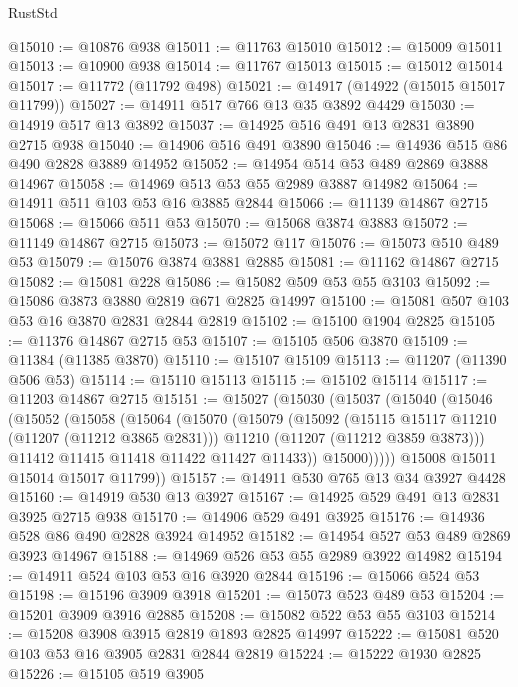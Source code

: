 \begin{lexlean}{RustStd}
\begin{coremodule}
@15010 := @10876 @938
@15011 := @11763 @15010
@15012 := @15009 @15011
@15013 := @10900 @938
@15014 := @11767 @15013
@15015 := @15012 @15014
@15017 := @11772 (@11792 @498)
@15021 := @14917 (@14922 (@15015 @15017 @11799))
@15027 := @14911 @517 @766 @13 @35 @3892 @4429
@15030 := @14919 @517 @13 @3892
@15037 := @14925 @516 @491 @13 @2831 @3890 @2715 @938
@15040 := @14906 @516 @491 @3890
@15046 := @14936 @515 @86 @490 @2828 @3889 @14952
@15052 := @14954 @514 @53 @489 @2869 @3888 @14967
@15058 := @14969 @513 @53 @55 @2989 @3887 @14982
@15064 := @14911 @511 @103 @53 @16 @3885 @2844
@15066 := @11139 @14867 @2715
@15068 := @15066 @511 @53
@15070 := @15068 @3874 @3883
@15072 := @11149 @14867 @2715
@15073 := @15072 @117
@15076 := @15073 @510 @489 @53
@15079 := @15076 @3874 @3881 @2885
@15081 := @11162 @14867 @2715
@15082 := @15081 @228
@15086 := @15082 @509 @53 @55 @3103
@15092 := @15086 @3873 @3880 @2819 @671 @2825 @14997
@15100 := @15081 @507 @103 @53 @16 @3870 @2831 @2844 @2819
@15102 := @15100 @1904 @2825
@15105 := @11376 @14867 @2715 @53
@15107 := @15105 @506 @3870
@15109 := @11384 (@11385 @3870)
@15110 := @15107 @15109
@15113 := @11207 (@11390 @506 @53)
@15114 := @15110 @15113
@15115 := @15102 @15114
@15117 := @11203 @14867 @2715
@15151 := @15027
    (@15030
      (@15037
        (@15040
          (@15046
            (@15052
              (@15058
                (@15064
                  (@15070
                    (@15079
                      (@15092
                        (@15115 @15117 @11210 (@11207 (@11212 @3865 @2831)))
                        @11210
                        (@11207 (@11212 @3859 @3873)))
                      @11412
                      @11415
                      @11418
                      @11422
                      @11427
                      @11433))
                  @15000)))))
        @15008
        @15011
        @15014
        @15017
        @11799))
@15157 := @14911 @530 @765 @13 @34 @3927 @4428
@15160 := @14919 @530 @13 @3927
@15167 := @14925 @529 @491 @13 @2831 @3925 @2715 @938
@15170 := @14906 @529 @491 @3925
@15176 := @14936 @528 @86 @490 @2828 @3924 @14952
@15182 := @14954 @527 @53 @489 @2869 @3923 @14967
@15188 := @14969 @526 @53 @55 @2989 @3922 @14982
@15194 := @14911 @524 @103 @53 @16 @3920 @2844
@15196 := @15066 @524 @53
@15198 := @15196 @3909 @3918
@15201 := @15073 @523 @489 @53
@15204 := @15201 @3909 @3916 @2885
@15208 := @15082 @522 @53 @55 @3103
@15214 := @15208 @3908 @3915 @2819 @1893 @2825 @14997
@15222 := @15081 @520 @103 @53 @16 @3905 @2831 @2844 @2819
@15224 := @15222 @1930 @2825
@15226 := @15105 @519 @3905

\end{coremodule}
\end{lexlean}
